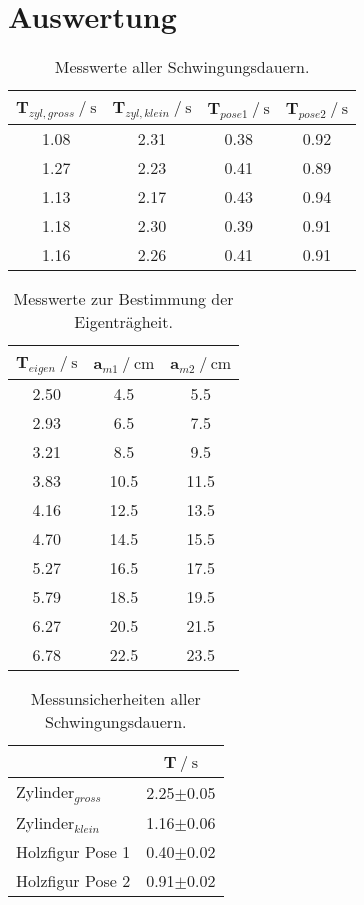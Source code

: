 \section{Auswertung}
\label{sec:Auswertung}

\begin{table}
    \centering
    \caption{Messwerte aller Schwingungsdauern.}
    \label{tab:messSchwing}
    \begin{tabular}{c c c c}
        \toprule
        {T$_{zyl, gross}\:/\:\si{\second}$} & {T$_{zyl, klein}\:/\:\si{\second}$} & {T$_{pose1}\:/\:\si{\second}$} & {T$_{pose2}\:/\:\si{\second}$} \\
        \midrule
        1.08 & 2.31 & 0.38 & 0.92 \\
        1.27 & 2.23 & 0.41 & 0.89 \\
        1.13 & 2.17 & 0.43 & 0.94 \\
        1.18 & 2.30 & 0.39 & 0.91 \\
        1.16 & 2.26 & 0.41 & 0.91 \\
        \bottomrule
    \end{tabular}
\end{table}

\begin{table}
    \centering
    \caption{Messwerte zur Bestimmung der Eigenträgheit.}
    \label{tab:messEigen}
    \begin{tabular}{c c c}
        \toprule
        {T$_{eigen}\:/\:\si{\second}$} & {a$_{m1}\:/\:\si{\centi\meter}$} & {a$_{m2}\:/\:\si{\centi\meter}$} \\
        \midrule
        2.50 & 4.5  & 5.5  \\
        2.93 & 6.5  & 7.5  \\
        3.21 & 8.5  & 9.5  \\
        3.83 & 10.5 & 11.5 \\
        4.16 & 12.5 & 13.5 \\
        4.70 & 14.5 & 15.5 \\
        5.27 & 16.5 & 17.5 \\
        5.79 & 18.5 & 19.5 \\
        6.27 & 20.5 & 21.5 \\
        6.78 & 22.5 & 23.5 \\
        \bottomrule
    \end{tabular}
\end{table}

\begin{table}
    \centering
    \caption{Messunsicherheiten aller Schwingungsdauern.}
    \label{tab:mittelSchwing}
    \begin{tabular}{l c}
        \toprule
        & {T$\:/\:\si{\second}$} \\     %
        \midrule
        Zylinder$_{gross}$  & 2.25$\pm$0.05 \\
        Zylinder$_{klein}$  & 1.16$\pm$0.06 \\
        Holzfigur Pose 1    & 0.40$\pm$0.02 \\
        Holzfigur Pose 2    & 0.91$\pm$0.02 \\
        \bottomrule
    \end{tabular}
\end{table}